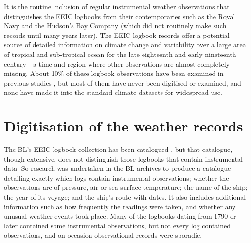 \documentclass[CP]{copernicus}
\begin{document}
It is the routine inclusion of regular instrumental weather observations that distinguishes the EEIC logbooks from their contemporaries such as the Royal Navy and the Hudson's Bay Company (which did not routinely make such records until many years later). The EEIC logbook records offer a potential source of detailed information on climate change and variability over a large area of tropical and sub-tropical ocean for the late eighteenth and early nineteenth century - a time and region where other observations are almost completely missing. About 10\% of these logbook observations have been examined in previous studies \citep{chenoweth96,farrington98,chenoweth00homogenization}, but most of them have never been digitised or examined, and none have made it into the standard climate datasets for widespread use.

\section{Digitisation of the weather records}

The BL's EEIC logbook collection has been catalogued \citep{Farrington99}, but that catalogue, though extensive, does not distinguish those logbooks that contain instrumental data. So research was undertaken in the BL archives to produce a catalogue detailing exactly which logs contain instrumental observations; whether the observations are of pressure, air or sea surface temperature; the name of the ship; the year of its voyage; and the ship's route with dates. It also includes additional information such as how frequently the readings were taken, and whether any unusual weather events took place. Many of the logbooks dating from 1790 or later contained some instrumental observations, but not every log contained observations, and on occasion observational records were sporadic.
\end{document}
